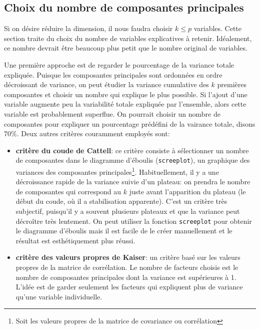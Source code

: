 \documentclass[
  11pt,
  letterpaper,
]{scrbook}
\providecommand{\tightlist}{%
  \setlength{\itemsep}{0pt}\setlength{\parskip}{0pt}}\usepackage{longtable,booktabs,array}
\theoremstyle{definition}
\theoremstyle{remark}
\begin{document}
\hypertarget{sec-acp-choix}{%
\subsection{Choix du nombre de composantes
principales}\label{sec-acp-choix}}

Si on désire réduire la dimension, il nous faudra choisir \(k \leq p\)
variables. Cette section traite du choix du nombre de variables
explicatives à retenir. Idéalement, ce nombre devrait être beaucoup plus
petit que le nombre original de variables.

Une première approche est de regarder le pourcentage de la variance
totale expliquée. Puisque les composantes principales sont ordonnées en
ordre décroissant de variance, on peut étudier la variance cumulative
des \(k\) premières composantes et choisir un nombre qui explique le
plus possible. Si l'ajout d'une variable augmente peu la variabilité
totale expliquée par l'ensemble, alors cette variable est probablement
superflue. On pourrait choisir un nombre de composantes pour expliquer
un pourcentage prédéfini de la vairance totale, disons 70\%. Deux autres
critères couramment employés sont:

\begin{itemize}
\tightlist
\item
  \textbf{critère du coude de Cattell}: ce critère consiste à
  sélectionner un nombre de composantes dans le diagramme d'éboulis
  (\texttt{screeplot}), un graphique des variances des composantes
  principales\footnote{Soit les valeurs propres de la matrice de
    covariance ou corrélation}. Habituellement, il y a une décroissance
  rapide de la variance suivie d'un plateau: on prendra le nombre de
  composantes qui correspond au \(k\) juste avant l'apparition du
  plateau (le début du coude, où il a stabilisation apparente). C'est un
  critère très subjectif, puisqu'il y a souvent plusieurs plateaux et
  que la variance peut décroître très lentement. On peut utiliser la
  fonction \texttt{screeplot} pour obtenir le diagramme d'éboulis mais
  il est facile de le créer manuellement et le résultat est
  esthétiquement plus réussi.
\item
  \textbf{critère des valeurs propres de Kaiser}: un critère basé sur
  les valeurs propres de la matrice de corrélation. Le nombre de
  facteurs choisis est le nombre de composantes principales dont la
  variance est supérieures à 1. L'idée est de garder seulement les
  facteurs qui expliquent plus de variance qu'une variable individuelle.
\end{itemize}
\end{document}
